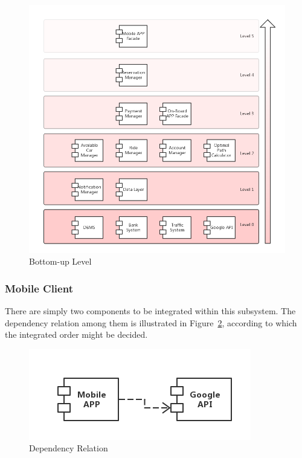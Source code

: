 \documentclass[a4paper,11pt]{article}
\begin{document}
		\begin{figure}[H]
   			\centering
  			\includegraphics[width=\textwidth]{images/level}
  	    		\caption{Bottom-up Level}\label{fig-level}
		\end{figure}
	\subsubsection{Mobile Client}
	There are simply two components to be integrated within this subsystem. The dependency relation among them is illustrated in Figure~\ref{fig-depm}, according to which the integrated order might be decided.
		\begin{figure}[H]
   			\centering
  			\includegraphics[width=\textwidth]{images/depm}
  	    		\caption{Dependency Relation}\label{fig-depm}
		\end{figure}
	
\end{document}
